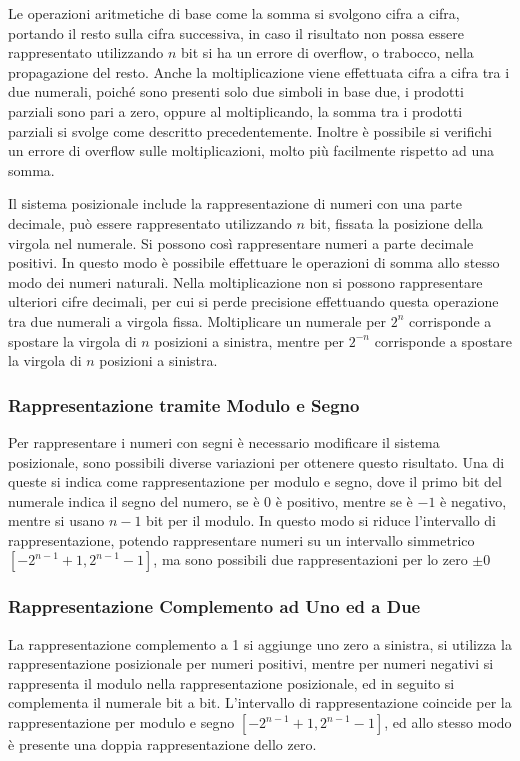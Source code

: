 \documentclass{article}
\numberwithin{equation}{subsection}
\begin{document}
Le operazioni aritmetiche di base come la somma si svolgono cifra a cifra, portando il resto sulla cifra successiva, in caso il risultato non possa essere rappresentato 
utilizzando $n$ bit si ha un errore di overflow, o trabocco, nella propagazione del resto. 
Anche la moltiplicazione viene effettuata cifra a cifra tra i due numerali, poiché sono presenti solo due simboli in base due, i prodotti parziali sono pari a zero, oppure 
al moltiplicando, la somma tra i prodotti parziali si svolge come descritto precedentemente. Inoltre è possibile si verifichi un errore di overflow sulle moltiplicazioni, 
molto più facilmente rispetto ad una somma. 

Il sistema posizionale include la rappresentazione di numeri con una parte decimale, può essere rappresentato utilizzando $n$ bit, fissata la posizione della virgola nel 
numerale. Si possono così rappresentare numeri a parte decimale positivi. In questo modo è possibile effettuare le operazioni di somma allo stesso modo dei numeri naturali. 
Nella moltiplicazione non si possono rappresentare ulteriori cifre decimali, per cui si perde precisione effettuando questa operazione tra due numerali a virgola fissa. 
Moltiplicare un numerale per $2^n$ corrisponde a spostare la virgola di $n$ posizioni a sinistra, mentre per $2^{-n}$ corrisponde a spostare la virgola di $n$ posizioni a 
sinistra. 

\subsubsection{Rappresentazione tramite Modulo e Segno}
Per rappresentare i numeri con segni è necessario modificare il sistema posizionale, sono possibili diverse variazioni per ottenere questo risultato. 
Una di queste si indica 
come rappresentazione per modulo e segno, dove il primo bit del numerale indica il segno del numero, se è $0$ è positivo, mentre se è $-1$ è negativo, mentre si usano $n-1$ bit 
per il modulo. In questo modo si riduce l'intervallo di rappresentazione, potendo rappresentare numeri su un intervallo simmetrico $[-2^{n-1}+1,2^{n-1}-1]$, ma sono 
possibili due rappresentazioni per lo zero $\pm0$

\subsubsection{Rappresentazione Complemento ad Uno ed a Due}
La rappresentazione complemento a 1 si aggiunge uno zero a sinistra, si utilizza la rappresentazione posizionale per numeri positivi, mentre per numeri negativi si rappresenta 
il modulo nella rappresentazione posizionale, ed in seguito si complementa il numerale bit a bit. L'intervallo di rappresentazione coincide per la rappresentazione per modulo e segno 
$[-2^{n-1}+1,2^{n-1}-1]$, ed allo stesso modo è presente una doppia rappresentazione dello zero. 
\end{document}
